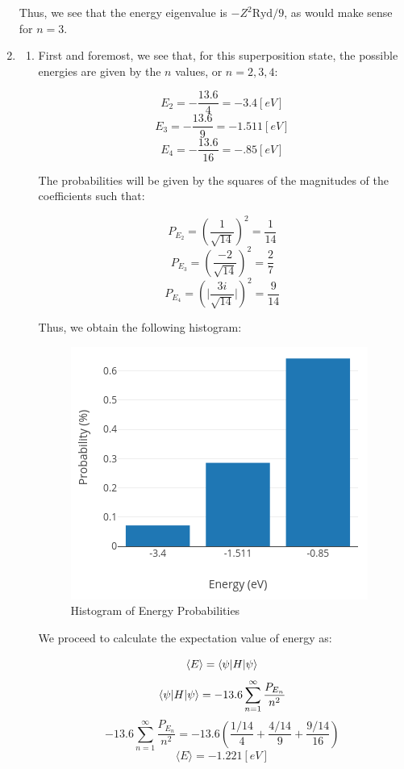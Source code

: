 \begin{enumerate}
   Thus, we see that the energy eigenvalue is $-Z^2\text{Ryd}/9$, as would make sense for $n=3$.

  \item

    \begin{enumerate}

      \item First and foremost, we see that, for this superposition state, the possible energies are given by the $n$ values, or $n=2,3,4$:

        $$\boxed{E_2=-\frac{13.6}{4}=-3.4[\si{eV}]}$$
        $$\boxed{E_3=-\frac{13.6}{9}=-1.511[\si{eV}]}$$
        $$\boxed{E_4=-\frac{13.6}{16}=-.85[\si{eV}]}$$

        The probabilities will be given by the squares of the magnitudes of the coefficients such that:

        $$\boxed{P_{E_2}=\left( \frac{1}{\sqrt{14}} \right)^2=\frac{1}{14}}$$
        $$\boxed{P_{E_3}=\left( \frac{-2}{\sqrt{14}} \right)^2=\frac{2}{7}}$$
        $$\boxed{P_{E_4}=\left( \Big|\frac{3i}{\sqrt{14}}\Big| \right)^2=\frac{9}{14}}$$

        Thus, we obtain the following histogram:

        \begin{figure}[H]
          \centering
          \includegraphics[width=.5\textwidth]{Figures/HW8-2a}
          \caption{Histogram of Energy Probabilities}
          \label{fig:1}
        \end{figure}

        We proceed to calculate the expectation value of energy as:

        $$\langle E\rangle =\bra{\psi|H}\ket{\psi}$$
        $$\bra{\psi|H}\ket{\psi}=-13.6\sum_{n=1}^{\infty} \frac{P_{E_n}}{n^2}$$
        $$-13.6\sum_{n=1}^{\infty} \frac{P_{E_n}}{n^2}=-13.6\left( \frac{1/14}{4}+\frac{4/14}{9}+\frac{9/14}{16} \right)$$
        $$\boxed{\langle E\rangle=-1.221[\si{eV}]}$$


\end{enumerate}
\end{enumerate}
